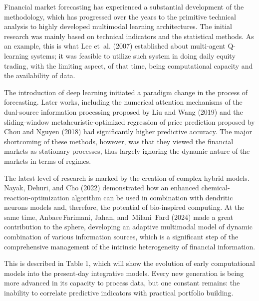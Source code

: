 \documentclass{singlecol-new}
\theoremstyle{TH}{
\newtheorem{lemma}{Lemma}
\newtheorem{theorem}[lemma]{Theorem}
\newtheorem{corrolary}[lemma]{Corrolary}
\newtheorem{conjecture}[lemma]{Conjecture}
\newtheorem{proposition}[lemma]{Proposition}
\newtheorem{claim}[lemma]{Claim}
\newtheorem{stheorem}[lemma]{Wrong Theorem}
\newtheorem{algorithm}{Algorithm}
}
\theoremstyle{THrm}{
\newtheorem{definition}{Definition}[section]
\newtheorem{question}{Question}[section]
\newtheorem{remark}{Remark}
\newtheorem{scheme}{Scheme}
}
\theoremstyle{THhit}{
\newtheorem{case}{Case}[section]
}
\begin{document}
Financial market forecasting has experienced a substantial development of the methodology, which has progressed over the years to the primitive technical analysis to highly developed multimodal learning architectures. The initial research was mainly based on technical indicators and the statistical methods. As an example, this is what Lee et al. (2007) established about multi-agent Q-learning systems; it was feasible to utilize such system in doing daily equity trading, with the limiting aspect, of that time, being computational capacity and the availability of data.

The introduction of deep learning initiated a paradigm change in the process of forecasting. Later works, including the numerical attention mechanisms of the dual-source information processing proposed by Liu and Wang (2019) and the sliding-window metaheuristic-optimized regression of price prediction proposed by Chou and Nguyen (2018) had significantly higher predictive accuracy. The major shortcoming of these methods, however, was that they viewed the financial markets as stationary processes, thus largely ignoring the dynamic nature of the markets in terms of regimes.

The latest level of research is marked by the creation of complex hybrid models. Nayak, Dehuri, and Cho (2022) demonstrated how an enhanced chemical-reaction-optimization algorithm can be used in combination with dendritic neurons models and, therefore, the potential of bio-inspired computing. At the same time, Anbaee Farimani, Jahan, and Milani Fard (2024) made a great contribution to the sphere, developing an adaptive multimodal model of dynamic combination of various information sources, which is a significant step of the comprehensive management of the intrinsic heterogeneity of financial information.

This is described in Table 1, which will show the evolution of early computational models into the present-day integrative models. Every new generation is being more advanced in its capacity to process data, but one constant remains: the inability to correlate predictive indicators with practical portfolio building.
\end{document}
